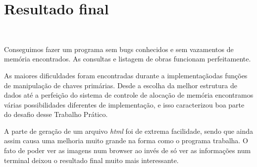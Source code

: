 \documentclass{article}
\begin{document}
\section{Resultado final}\

Conseguimos fazer um programa sem bugs conhecidos e sem vazamentos de memória encontrados. As consultas e listagem de obras funcionam perfeitamente.

As maiores dificuldades foram encontradas durante a implementaçãodas funções de manipulação de chaves primárias. Desde a escolha da melhor estrutura de dados até a perfeição do sistema de controle de alocação de memória encontramos várias possibilidades diferentes de implementação, e isso caracterizou boa parte do desafio desse Trabalho Prático.

A parte de geração de um arquivo \textit{html} foi de extrema facilidade, sendo que ainda assim causa uma melhoria muito grande na forma como o programa trabalha. O fato de poder ver as imagens num browser ao invés de só ver as informações num terminal deixou o resultado final muito mais interessante.
\end{document}
